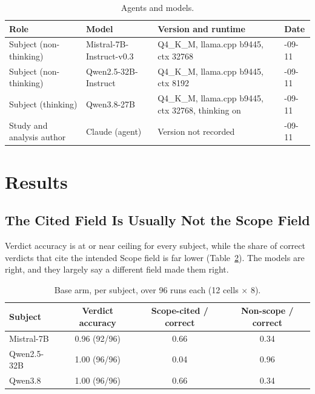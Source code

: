 \documentclass[11pt,a4paper]{article}
\begin{document}
\begin{table}[h]
\centering
\small
\caption{Agents and models.}
\label{tab:agents}
\begin{tabular}{@{}>{\raggedright\arraybackslash}p{3.1cm}>{\raggedright\arraybackslash}p{3.6cm}>{\raggedright\arraybackslash}p{4.6cm}>{\raggedright\arraybackslash}p{2.4cm}@{}}
\toprule
Role & Model & Version and runtime & Date \\
\midrule
Subject (non-thinking) & Mistral-7B-Instruct-v0.3 & Q4\_K\_M, llama.cpp b9445, ctx 32768 & 2026-09-11 \\
Subject (non-thinking) & Qwen2.5-32B-Instruct & Q4\_K\_M, llama.cpp b9445, ctx 8192 & 2026-09-11 \\
Subject (thinking) & Qwen3.8-27B & Q4\_K\_M, llama.cpp b9445, ctx 32768, thinking on & 2026-09-11 \\
Study and analysis author & Claude (agent) & Version not recorded & 2026-09-11 \\
\bottomrule
\end{tabular}
\end{table}

\section{Results}

\subsection{The Cited Field Is Usually Not the Scope Field}

Verdict accuracy is at or near ceiling for every subject, while the share of
correct verdicts that cite the intended Scope field is far lower
(Table~\ref{tab:h1}). The models are right, and they largely say a different field
made them right.

\begin{table}[h]
\centering
\small
\caption{Base arm, per subject, over 96 runs each (12 cells $\times$ 8).}
\label{tab:h1}
\begin{tabular}{@{}lccc@{}}
\toprule
Subject & Verdict accuracy & Scope-cited / correct & Non-scope / correct \\
\midrule
Mistral-7B & 0.96 (92/96) & 0.66 & 0.34 \\
Qwen2.5-32B & 1.00 (96/96) & 0.04 & 0.96 \\
Qwen3.8 & 1.00 (96/96) & 0.66 & 0.34 \\
\bottomrule
\end{tabular}
\end{table}
\end{document}
